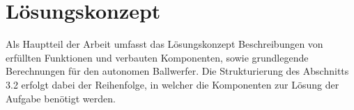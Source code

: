 \section{Lösungskonzept}
Als Hauptteil der Arbeit umfasst das Lösungskonzept Beschreibungen von erfüllten Funktionen und verbauten Komponenten, sowie 
grundlegende Berechnungen für den autonomen Ballwerfer. Die Strukturierung des Abschnitts 3.2 erfolgt dabei der Reihenfolge, in welcher die Komponenten zur Lösung der Aufgabe benötigt werden.